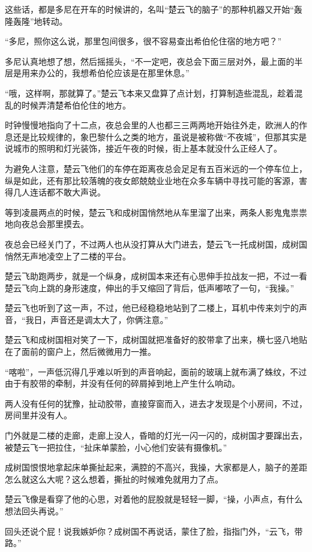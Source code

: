 这些话，都是多尼在开车的时候讲的，名叫“楚云飞的脑子”的那种机器又开始“轰隆轰隆”地转动。

“多尼，照你这么说，那里包间很多，很不容易查出希伯伦住宿的地方吧？”

多尼认真地想了想，然后摇摇头，“不一定吧，夜总会下面三层对外，最上面的半层是用来办公的，我想希伯伦应该是在那里休息。”

“哦，这样啊，那就算了。”楚云飞本来又盘算了点计划，打算制造些混乱，趁着混乱的时候弄清楚希伯伦住的地方。

时钟慢慢地指向了十二点，夜总会里的人也都三三两两地开始往外走，欧洲人的作息还是比较规律的，象巴黎什么之类的地方，虽说是被称做“不夜城”，但那其实是说城市的照明和灯光装饰，接近午夜的时候，街上基本就没什么正经人了。

为避免人注意，楚云飞他们的车停在距离夜总会足足有五百米远的一个停车位上，纵是如此，还有那比较落魄的夜女郎兢兢业业地在众多车辆中寻找可能的客源，害得几人连话都不敢大声说。

等到凌晨两点的时候，楚云飞和成树国悄然地从车里溜了出来，两条人影鬼鬼祟祟地向夜总会那里摸去。

夜总会已经关门了，不过两人也从没打算从大门进去，楚云飞一托成树国，成树国悄然无声地凌空上了二楼的平台。

楚云飞助跑两步，就是一个纵身，成树国本来还有心思伸手拉战友一把，不过一看楚云飞向上跳的身形速度，伸出的手又缩回了背后，低声嘟哝了一句，“我操。”

楚云飞也听到了这一声，不过，他已经稳稳地站到了二楼上，耳机中传来刘宁的声音，“我日，声音还是调太大了，你俩注意。”

楚云飞和成树国相对笑了一下，成树国就把准备好的胶带拿了出来，横七竖八地贴在了面前的窗户上，然后微微用力一推。

“喀啦”，一声低沉得几乎难以听到的声音响起，面前的玻璃上就布满了蛛纹，不过由于有胶带的牵制，并没有任何的碎屑掉到地上产生什么响动。

两人没有任何的犹豫，扯动胶带，直接穿窗而入，进去才发现是个小房间，不过，房间里并没有人。

门外就是二楼的走廊，走廊上没人，昏暗的灯光一闪一闪的，成树国才要蹿出去，被楚云飞一把拉住，“扯床单蒙脸，小心他们安装有摄像机。”

成树国恨恨地拿起床单撕扯起来，满腔的不高兴，我操，大家都是人，脑子的差距怎么就这么大呢？这么想着，撕扯的时候难免就用力了点。

楚云飞像是看穿了他的心思，对着他的屁股就是轻轻一脚，“操，小声点，有什么想法回头再说。”

回头还说个屁！说我嫉妒你？成树国不再说话，蒙住了脸，指指门外，“云飞，带路。”

